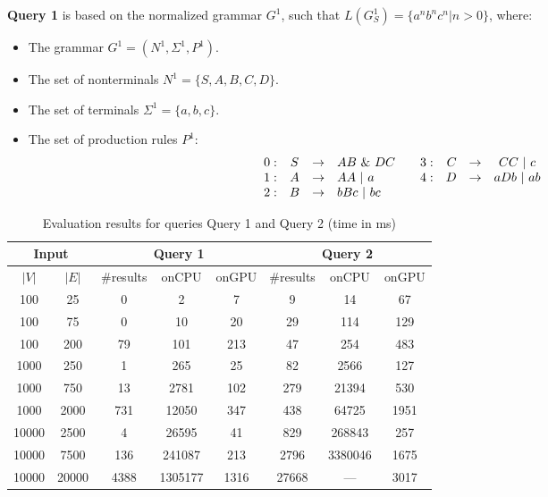 \textbf{Query 1} is based on the normalized grammar $G^1$, such that $L(G^1_S) = \{a^n b^n c^n | n > 0\}$, where:
\begin{itemize}
    \item The grammar $G^1 = (N^1, \Sigma^1, P^1)$.
    \item The set of nonterminals $N^1 = \{S, A, B, C, D\}$.
    \item The set of terminals $\Sigma^1 = \{a, b, c\}.$
    \item The set of production rules $P^1$:
    \[
    \begin{array}{rcclrrccl}
    0: & S & \rightarrow & AB ~\& ~DC  \hfill & \quad 3: & C & \rightarrow & CC ~|~ c\\ 
    1: & A & \rightarrow & AA ~|~ a \hfill &\quad     4: & D & \rightarrow & aDb ~|~ ab \\ 
    2: & B & \rightarrow & bBc ~|~ bc \\
    \end{array}
    \]
\end{itemize}
\begin{table*}
    \centering
    \caption{Evaluation results for queries Query 1 and Query 2 (time in ms)}
    \label{tbl1}
    
    \begin{tabular}{ | c | c || c | c | c || c | c | c |}
        \hline
        \multicolumn{2}{|c||}{Input} & \multicolumn{3}{|c||}{Query 1} & \multicolumn{3}{|c|}{Query 2} \\
        \hline
        $|V|$ & $|E|$ & \#results & onCPU & onGPU & \#results & onCPU & onGPU \\
        \hline 
        \hline
        100 & 25 & 0 & 2 & 7 & 9 & 14 & 67\\
        100 & 75 & 0 & 10 & 20 & 29 & 114 & 129\\
        100 & 200 & 79 & 101 & 213 & 47 & 254 & 483\\
        1000  & 250 & 1 & 265 & 25 & 82 & 2566 & 127\\
        1000 & 750 & 13 & 2781 & 102 & 279 & 21394 & 530\\
        1000 & 2000 & 731 & 12050 & 347 & 438 & 64725 & 1951\\
        10000 & 2500 & 4 & 26595 & 41 & 829 & 268843 & 257\\
        10000 & 7500 & 136 & 241087 & 213 & 2796 & 3380046 & 1675\\
        10000 & 20000 & 4388 & 1305177 & 1316 & 27668 & --- & 3017\\
        \hline
    \end{tabular}
    
\end{table*}

